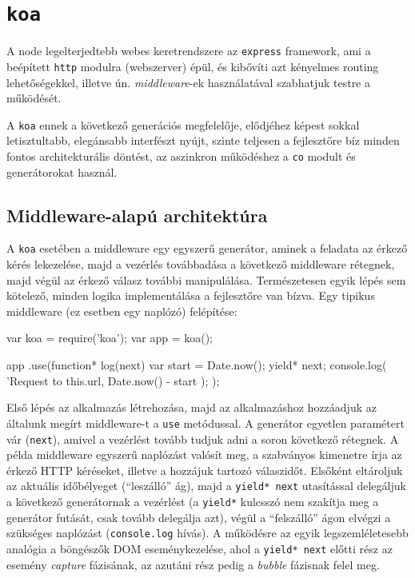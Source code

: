 \section{\texttt{koa}}

A node legelterjedtebb webes keretrendszere az \verb=express=\cite{Express}
framework, ami a beépített \verb=http= modulra (webszerver) épül,
és kibővíti azt kényelmes routing lehetőségekkel,
illetve ún. \emph{middleware}-ek használatával szabhatjuk testre a működését.

A \verb=koa=\cite{Koa} ennek a következő generációs megfelelője,
elődjéhez képest sokkal letisztultabb, elegánsabb interfészt nyújt,
szinte teljesen a fejlesztőre bíz minden fontos architekturális döntést,
az aszinkron működéshez a \verb=co= modult és generátorokat használ.

\subsection{Middleware-alapú architektúra}

A \verb=koa= esetében a middleware egy egyszerű generátor, aminek a feladata
az érkező kérés lekezelése, majd a vezérlés továbbadása a következő
middleware rétegnek, majd végül az érkező válasz további manipulálása.
Természetesen egyik lépés sem kötelező, minden logika implementálása a
fejlesztőre van bízva. Egy tipikus middleware (ez esetben egy naplózó)
felépítése:

\begin{js}
var koa = require('koa');
var app = koa();

app
  .use(function* log(next) {
    var start = Date.now();
    yield* next;
    console.log(
      'Request to %
      this.url,
      Date.now() - start
    );
  });
\end{js}

Első lépés az alkalmazás létrehozása, majd az alkalmazáshoz hozzáadjuk az
általunk megírt middleware-t a \verb=use= metódussal.
A generátor egyetlen paramétert vár (\verb=next=), amivel a vezérlést
tovább tudjuk adni a soron következő rétegnek.
A példa middleware egyszerű naplózást valósít meg, a szabványos kimenetre
írja az érkező HTTP kéréseket, illetve a hozzájuk tartozó válaszidőt.
Elsőként eltároljuk az aktuális időbélyeget (``leszálló'' ág),
majd a \verb=yield* next= utasítással delegáljuk a következő generátornak a
vezérlést (a \verb=yield*= kulcsszó nem szakítja meg a generátor futását,
csak tovább delegálja azt), végül a ``felszálló'' ágon elvégzi a szükséges
naplózást (\verb=console.log= hívás).
A működésre az egyik legszemléletesebb analógia a böngészők DOM eseménykezelése,
ahol a \verb=yield* next= előtti rész az esemény \emph{capture} fázisának,
az azutáni rész pedig a \emph{bubble} fázisnak felel meg.

